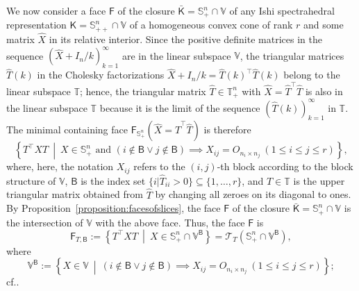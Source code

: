 \documentclass[oneside]{amsart}
\theoremstyle{plain}
\theoremstyle{definition}
\theoremstyle{remark}
\numberwithin{equation}{section}
\begin{document}
We now consider a face $\mathsf{F}$ of the closure $\bar{\mathsf{K}} =
\mathbb{S}^{n}_{+} \cap \mathbb{V}$ of any Ishi spectrahedral
representation $\mathsf{K} = \mathbb{S}^{n}_{++} \cap \mathbb{V}$ of a
homogeneous convex cone of rank $r$ and some matrix $\hat{X}$ in its
relative interior. Since the positive definite matrices in the sequence
$(\hat{X} + I_{n} / k)_{k=1}^\infty$ are in the linear subspace
$\mathbb{V}$, the triangular matrices $\hat{T}(k)$ in the Cholesky
factorizations $\hat{X} + I_{n} / k = \hat{T}(k)^{\top} \hat{T}(k)$ belong
to the linear subspace $\mathbb{T}$; hence, the triangular matrix $\hat{T}
\in \mathbb{T}^{n}_{+}$ with $\hat{X} = \hat{T}^{\top} \hat{T}$ is also in
the linear subspace $\mathbb{T}$ because it is the limit of the sequence
$(\hat{T}(k))_{k=1}^\infty$ in $\mathbb{T}$. The minimal containing face
$\mathsf{F}_{\mathbb{S}^{n}_{+}}(\hat{X} = \hat{T}^{\top} \hat{T})$ is
therefore
\[
\left\{T^{\top} X T\ \middle|\ X \in \mathbb{S}^{n}_{+} \text{ and } (i
\notin \mathsf{B} \vee j \notin \mathsf{B}) \implies X_{ij} = O_{n_{i}
\times n_{j}} \ (1 \leq i \leq j \leq r)\right\},
\]
where, here, the notation $X_{ij}$ refers to the $(i, j)$-th block
according to the block structure of $\mathbb{V}$, $\mathsf{B}$ is the index
set $\{i|\hat{T}_{ii} > 0\} \subseteq \{1, \dotsc, r\}$, and $T \in
\mathbb{T}$ is the upper triangular matrix obtained from $\hat{T}$ by
changing all zeroes on its diagonal to ones. By
Proposition~\ref{proposition:facesofslices}, the face $\mathsf{F}$ of the
closure $\bar{\mathsf{K}} = \mathbb{S}^{n}_{+} \cap \mathbb{V}$ is the
intersection of $\mathbb{V}$ with the above face. Thus, the face
$\mathsf{F}$ is
\[
\mathsf{F}_{T,\mathsf{B}} := \left\{T^{\top} X T\ \middle|\ X \in
\mathbb{S}^{n}_{+} \cap \mathbb{V}^{\mathsf{B}}\right\} = \mathcal{T}_{T}
\left( \mathbb{S}^{n}_{+} \cap \mathbb{V}^{\mathsf{B}} \right),
\]
where
\[
\mathbb{V}^{\mathsf{B}} := \left\{X \in \mathbb{V}\ \middle|\ (i \notin
\mathsf{B} \vee j \notin \mathsf{B}) \implies X_{ij} = O_{n_{i} \times
n_{j}} \ (1 \leq i \leq j \leq r)\right\};
\]
cf.\@ \cite[Proposition~18]{Chua06}.
\end{document}
